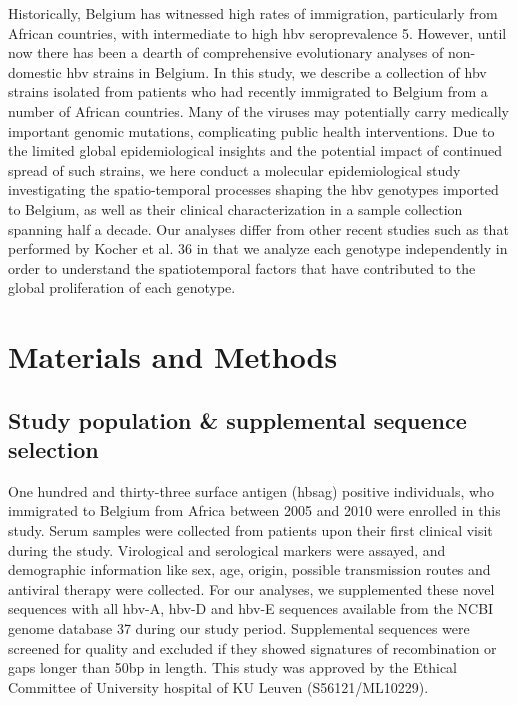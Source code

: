 Historically, Belgium has witnessed high rates of immigration, particularly from African countries, with intermediate to high \gls{hbv} seroprevalence 5.
However, until now there has been a dearth of comprehensive evolutionary analyses of non-domestic \gls{hbv} strains in Belgium.
In this study, we describe a collection of \gls{hbv} strains isolated from patients who had recently immigrated to Belgium from a number of African countries.
Many of the viruses may potentially carry medically important genomic mutations, complicating public health interventions.
Due to the limited global epidemiological insights and the potential impact of continued spread of such strains, we here conduct a molecular epidemiological study investigating the spatio-temporal processes shaping the \gls{hbv} genotypes imported to Belgium, as well as their clinical characterization in a sample collection spanning half a decade.
Our analyses differ from other recent studies such as that performed by Kocher et al. 36 in that we analyze each genotype independently in order to understand the spatiotemporal factors that have contributed to the global proliferation of each genotype.


\section{Materials and Methods}
\subsection{Study population \& supplemental sequence selection}
One hundred and thirty-three surface antigen (\gls{hbsag}) positive individuals, who immigrated to Belgium from Africa between 2005 and 2010 were enrolled in this study.
Serum samples were collected from patients upon their first clinical visit during the study.
Virological and serological markers were assayed, and demographic information like sex, age, origin, possible transmission routes and antiviral therapy were collected.
For our analyses, we supplemented these novel sequences with all \gls{hbv}-A, \gls{hbv}-D and \gls{hbv}-E sequences available from the NCBI genome database 37 during our study period.
Supplemental sequences were screened for quality and excluded if they showed signatures of recombination or gaps longer than 50bp in length.
This study was approved by the Ethical Committee of University hospital of KU Leuven (S56121/ML10229).\\

